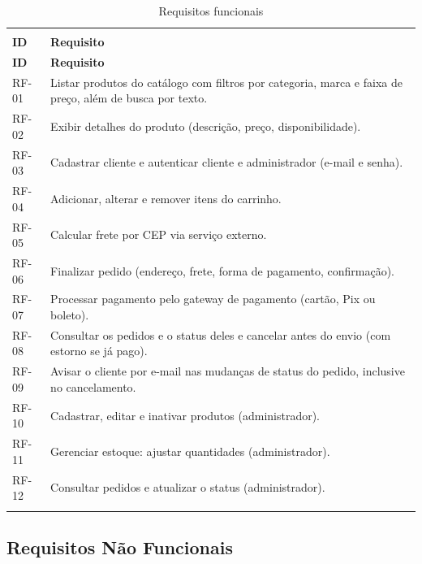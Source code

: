 \documentclass[12pt,a4paper]{article}
\begin{document}
{\setlength{\arrayrulewidth}{0.3pt}\renewcommand{\arraystretch}{1.05}
\begin{xltabular}{\textwidth}{>{\raggedright\arraybackslash}p{1.6cm}|>{\raggedright\arraybackslash}X}
\caption{Requisitos funcionais}\\
\toprule{}
\textbf{ID} & \textbf{Requisito}\\ \midrule{}
\endfirsthead
{}\toprule{}
\textbf{ID} & \textbf{Requisito}\\ \midrule{}
\endhead
\endlastfoot
RF-01 & Listar produtos do catálogo com filtros por categoria, marca e faixa de preço, além de busca por texto.\\ \hline
RF-02 & Exibir detalhes do produto (descrição, preço, disponibilidade).\\ \hline
RF-03 & Cadastrar cliente e autenticar cliente e administrador (e-mail e senha).\\ \hline
RF-04 & Adicionar, alterar e remover itens do carrinho.\\ \hline
RF-05 & Calcular frete por CEP via serviço externo.\\ \hline
RF-06 & Finalizar pedido (endereço, frete, forma de pagamento, confirmação).\\ \hline
RF-07 & Processar pagamento pelo gateway de pagamento (cartão, Pix ou boleto).\\ \hline
RF-08 & Consultar os pedidos e o status deles e cancelar antes do envio (com estorno se já pago).\\ \hline
RF-09 & Avisar o cliente por e-mail nas mudanças de status do pedido, inclusive no cancelamento.\\ \hline
RF-10 & Cadastrar, editar e inativar produtos (administrador).\\ \hline
RF-11 & Gerenciar estoque: ajustar quantidades (administrador).\\ \hline
RF-12 & Consultar pedidos e atualizar o status (administrador).\\ \bottomrule
\end{xltabular}}

\subsection*{Requisitos Não Funcionais}
\end{document}
